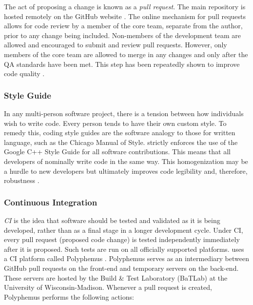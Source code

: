 The act of proposing a change is known as a \emph{pull request}. The main \Cyclus repository is
hosted remotely on the GitHub website \cite{dabbish_social_2012}. The online
mechanism for pull requests allows for code review by a member of the \Cyclus
core team, separate from the author, prior to any change being included. Non-members
of the \Cyclus development team are allowed and encouraged to submit and review
pull requests. However, only members of the \Cyclus core team are allowed to
merge in any changes and only after the \gls{QA} standards have been met. This
step has been repeatedly shown to improve code quality \cite{cohen_modern_2010}.

\subsubsection{Style Guide}

In any multi-person software project, there is a tension between how individuals
wish to write code. Every person tends to have their own custom style. To remedy this,
coding style guides are the software analogy to those for written language,
such as the Chicago Manual of Style. \Cyclus strictly enforces the use of the
Google C++ Style Guide \cite{weinberger_google_2008} for all software contributions.
This means that all developers of \Cyclus nominally write \Cyclus code in the same
way.  This homogenization may be a hurdle to new developers but ultimately
improves code legibility and, therefore, robustness \cite{cohen_modern_2010}.

\subsubsection{Continuous Integration}
\label{sec:qa-ci}

\emph{\acrfull{CI}} is the idea that software should be tested and validated
as it is being developed, rather than as a final stage in a longer development
cycle.  Under \gls{CI}, every pull request (proposed code change) is tested independently immediately after
it is proposed. Such tests are run on all officially supported platforms.
\Cyclus uses a \gls{CI} platform called Polyphemus
\cite{scopatz_polyphemus_2014}. Polyphemus serves as an intermediary between GitHub pull requests on the front-end
and temporary \Cyclus servers on the back-end. These servers are hosted by
the Build \& Test Laboratory (BaTLab) \cite{uw_batlab_team_batlab_2014} at the University of
Wisconsin-Madison. Whenever a pull request is created, Polyphemus performs
the following actions:

